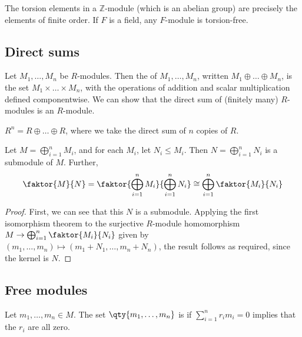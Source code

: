 \begin{example}
	The torsion elements in a $\mathbb Z$-module (which is an abelian group) are precisely the elements of finite order.
	If $F$ is a field, any $F$-module is torsion-free.
\end{example}

\subsection{Direct sums}
\begin{definition}
	Let $M_1, \dots, M_n$ be $R$-modules.
	Then the  of $M_1, \dots, M_n$, written $M_1 \oplus \dots \oplus M_n$, is the set $M_1 \times \dots \times M_n$, with the operations of addition and scalar multiplication defined componentwise.
	We can show that the direct sum of (finitely many) $R$-modules is an $R$-module.
\end{definition}

\begin{example}
	$R^n = R \oplus \dots \oplus R$, where we take the direct sum of $n$ copies of $R$.
\end{example}

\begin{lemma} \label{lem:15.1}
	Let $M = \bigoplus_{i=1}^n M_i$, and for each $M_i$, let $N_i \leq M_i$.
	Then $N = \bigoplus_{i=1}^n N_i$ is a submodule of $M$.
	Further,
	\begin{align*}
		\faktor{M}{N} = \faktor{\bigoplus_{i=1}^n M_i}{\bigoplus_{i=1}^n N_i} \cong \bigoplus_{i=1}^n \faktor{M_i}{N_i}
	\end{align*}
\end{lemma}

\begin{proof}
	First, we can see that this $N$ is a submodule.
	Applying the first isomorphism theorem to the surjective $R$-module homomorphism $M \to \bigoplus_{i=1}^n \faktor{M_i}{N_i}$ given by $(m_1, \dots, m_n) \mapsto (m_1 + N_1, \dots, m_n + N_n)$, the result follows as required, since the kernel is $N$.
\end{proof}

\subsection{Free modules}

\begin{definition}[Independent]
	Let $m_1, \dots, m_n \in M$.
	The set $\qty{m_1, \dots, m_n}$ is  if $\sum_{i=1}^n r_i m_i = 0$ implies that the $r_i$ are all zero.
\end{definition}

